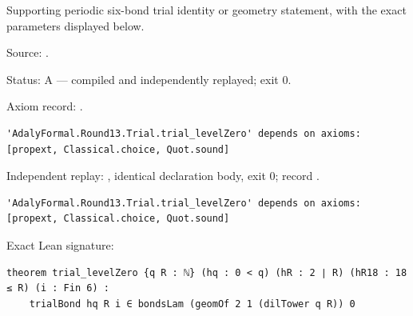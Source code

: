 \begin{theorem}[bp-366]
\label{bp-366}
\leanok
Supporting periodic six-bond trial identity or geometry statement, with the exact parameters displayed below.

\par Source: \texttt{}.
\par Status: A — compiled and independently replayed; exit 0.
\par Axiom record: \texttt{}.
\begin{verbatim}
'AdalyFormal.Round13.Trial.trial_levelZero' depends on axioms: [propext, Classical.choice, Quot.sound]
\end{verbatim}
\par Independent replay: \texttt{}, identical declaration body, exit 0; record \texttt{}.
\begin{verbatim}
'AdalyFormal.Round13.Trial.trial_levelZero' depends on axioms: [propext, Classical.choice, Quot.sound]
\end{verbatim}
\par Exact Lean signature:
\begin{verbatim}
theorem trial_levelZero {q R : ℕ} (hq : 0 < q) (hR : 2 ∣ R) (hR18 : 18 ≤ R) (i : Fin 6) :
    trialBond hq R i ∈ bondsLam (geomOf 2 1 (dilTower q R)) 0
\end{verbatim}
\end{theorem}

